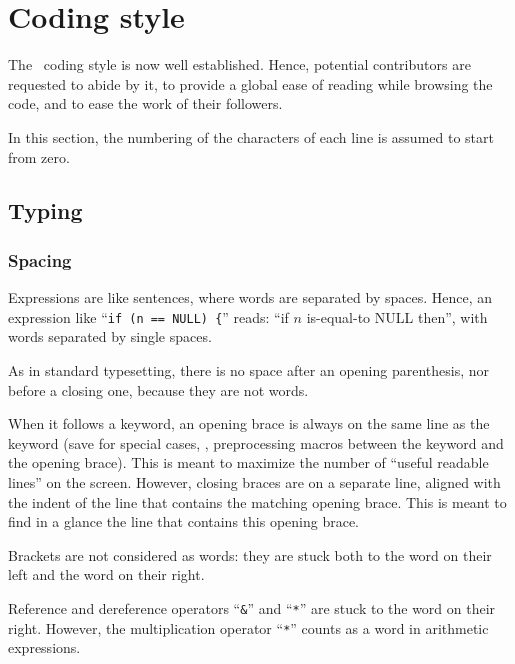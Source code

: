 
\section{Coding style}

The \scotch\ coding style is now well established. Hence, potential
contributors are requested to abide by it, to provide a global ease of
reading while browsing the code, and to ease the work of their
followers.

In this section, the numbering of the characters of each line is
assumed to start from zero.

\subsection{Typing}

\subsubsection{Spacing}

Expressions are like sentences, where words are separated by
spaces. Hence, an expression like ``\texttt{if~(n == NULL)~\{}''
reads: ``if $n$ is-equal-to NULL then'', with words separated by
single spaces.

As in standard typesetting, there is no space after an opening
parenthesis, nor before a closing one, because they are not words.

When it follows a keyword, an opening brace is always on the same line
as the keyword (save for special cases, \eg, preprocessing macros
between the keyword and the opening brace). This is meant to maximize
the number of ``useful readable lines'' on the screen. However,
closing braces are on a separate line, aligned with the indent of the
line that contains the matching opening brace. This is meant to find
in a glance the line that contains this opening brace.

Brackets are not considered as words: they are stuck both to the word
on their left and the word on their right.

Reference and dereference operators ``\texttt{\&}'' and ``\texttt{*}''
are stuck to the word on their right. However, the multiplication
operator ``\texttt{*}'' counts as a word in arithmetic expressions.


